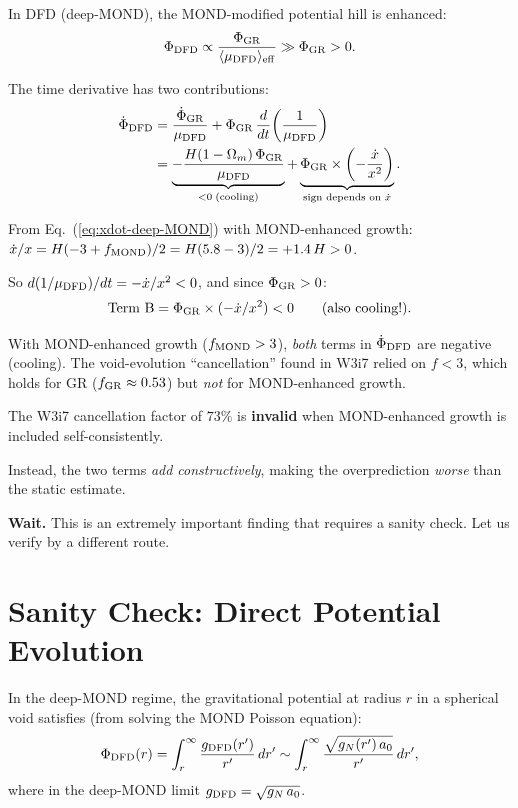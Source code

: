 \documentclass[11pt,a4paper]{article}
\newcommand{\aM}{a_0}
\newcommand{\mufd}{\mu_{\rm DFD}}
\newcommand{\Omm}{\Omega_m}
\newcounter{findingctr}
\newenvironment{finding}[1][]{%
  \refstepcounter{findingctr}%
  \begin{tcolorbox}[colback=blue!3!white, colframe=blue!50!black,
    title=\textbf{Finding \thefindingctr: #1}]
}{%
  \end{tcolorbox}%
}
\begin{document}
In DFD (deep-MOND), the MOND-modified potential hill is enhanced:
\begin{equation}
\Phi_{\rm DFD} \propto \frac{\Phi_{\rm GR}}{\langle\mufd\rangle_{\rm eff}}
\gg \Phi_{\rm GR} > 0.
\end{equation}

The time derivative has two contributions:
\begin{align}
\dot{\Phi}_{\rm DFD}
&= \frac{\dot{\Phi}_{\rm GR}}{\mufd}
+ \Phi_{\rm GR}\,\frac{d}{dt}\!\left(\frac{1}{\mufd}\right)
\nonumber\\
&= \underbrace{-\frac{H(1-\Omm)\,\Phi_{\rm GR}}{\mufd}}_{< 0\;\text{(cooling)}}
+ \underbrace{\Phi_{\rm GR}\times\left(-\frac{\dot{x}}{x^2}\right)}_{\text{sign depends on }\dot{x}}.
\label{eq:Phi-dot-signs}
\end{align}

From Eq.~(\ref{eq:xdot-deep-MOND}) with MOND-enhanced growth:
$\dot{x}/x = H(-3+f_{\rm MOND})/2 = H(5.8-3)/2 = +1.4\,H > 0$.

So $d(1/\mufd)/dt = -\dot{x}/x^2 < 0$, and since $\Phi_{\rm GR} > 0$:
\begin{equation}
\text{Term B} = \Phi_{\rm GR}\times(-\dot{x}/x^2) < 0
\qquad (\text{also cooling!}).
\end{equation}

\begin{finding}[Both Terms Cool --- No Cancellation]
\label{find:no-cancel}
With MOND-enhanced growth ($f_{\rm MOND} > 3$), \emph{both} terms in
$\dot{\Phi}_{\rm DFD}$ are negative (cooling). The void-evolution
``cancellation'' found in W3i7 relied on $f < 3$, which holds for
GR ($f_{\rm GR} \approx 0.53$) but \emph{not} for MOND-enhanced
growth.

The W3i7 cancellation factor of $73\%$ is \textbf{invalid} when
MOND-enhanced growth is included self-consistently.

Instead, the two terms \emph{add constructively}, making the
overprediction \emph{worse} than the static estimate.
\end{finding}

\textbf{Wait.} This is an extremely important finding that requires
a sanity check. Let us verify by a different route.


\section{Sanity Check: Direct Potential Evolution}
\label{sec:sanity}

In the deep-MOND regime, the gravitational potential at radius $r$
in a spherical void satisfies (from solving the MOND Poisson equation):
\begin{equation}
\Phi_{\rm DFD}(r) = \int_r^\infty \frac{g_{\rm DFD}(r')}{r'}\,dr'
\sim \int_r^\infty \frac{\sqrt{g_N(r')\,\aM}}{r'}\,dr',
\end{equation}
where in the deep-MOND limit $g_{\rm DFD} = \sqrt{g_N\,\aM}$.
\end{document}
